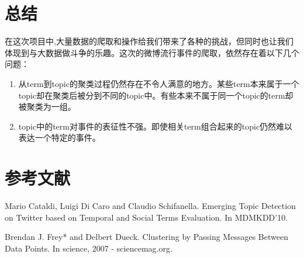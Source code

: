 \documentclass[a4paper]{article}
\begin{document}
\section{总结}
在这次项目中,大量数据的爬取和操作给我们带来了各种的挑战，但同时也让我们体现到与大数据做斗争的乐趣。这次的微博流行事件的爬取，依然存在着以下几个问题：
\begin{enumerate}
    \item 从term到topic的聚类过程仍然存在不令人满意的地方。某些term本来属于一个topic却在聚类后被分到不同的topic中。有些本来不属于同一个topic的term却被聚类为一组。
    \item topic中的term对事件的表征性不强。即使相关term组合起来的topic仍然难以表达一个特定的事件。
\end{enumerate}



\section{参考文献}
\begin{enumerate}[ {[}1{]} ]
\item Mario Cataldi, Luigi Di Caro and Claudio Schifanella. Emerging Topic Detection on Twitter based on Temporal and Social Terms Evaluation. In MDMKDD'10.
\item Brendan J. Frey* and Delbert Dueck. Clustering by Passing Messages Between Data Points. In science, 2007 - sciencemag.org.
\end{enumerate}
\end{document}
